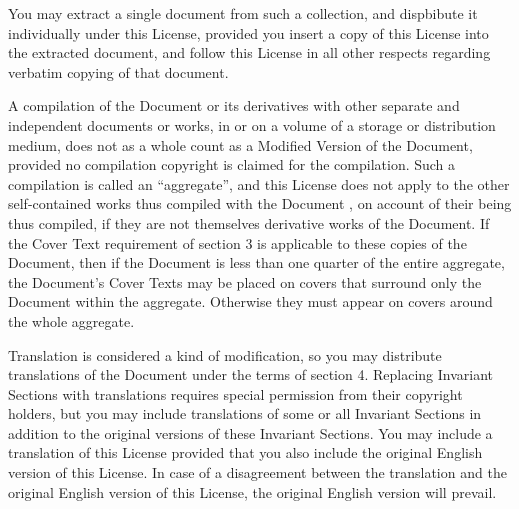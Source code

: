     
    

      You may extract a single document from such a collection, and
      dispbibute it individually under this License, provided you
      insert a copy of this License into the extracted document, and
      follow this License in all other respects regarding verbatim
      copying of that document.
    

    
    


    

      A compilation of the Document or its derivatives with
      other separate and independent documents or works, in or on a
      volume of a storage or distribution medium, does not as a whole
      count as a Modified Version
      of the Document, provided no compilation copyright is claimed
      for the compilation.  Such a compilation is called an
      ``aggregate'', and this License does not apply to the
      other self-contained works thus compiled with the Document , on
      account of their being thus compiled, if they are not themselves
      derivative works of the Document.  If the Cover Text requirement of 
      section 3 is applicable to these
      copies of the Document, then if the Document is less than one
      quarter of the entire aggregate, the Document's Cover Texts may
      be placed on covers that surround only the Document within the
      aggregate. Otherwise they must appear on covers around the whole
      aggregate.
    

    
    


    

      Translation is considered a kind of modification, so you may
      distribute translations of the Document under the terms of 
      section 4. Replacing  Invariant Sections with
      translations requires special permission from their copyright
      holders, but you may include translations of some or all
      Invariant Sections in addition to the original versions of these
      Invariant Sections. You may include a translation of this
      License provided that you also include the original English
      version of this License. In case of a disagreement between the
      translation and the original English version of this License,
      the original English version will prevail.
    

